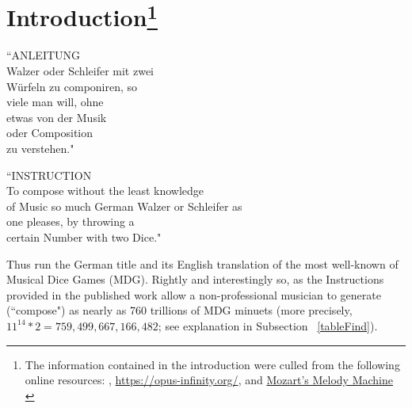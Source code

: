 \documentclass[letterpaper,x11names,svgnames,10pt]{article}
\begin{document}
\section[Introduction]{Introduction\footnote{The information contained in the introduction were culled from the following online resources:
	\citet{wiki_mw2017},
	\url{https://opus-infinity.org/}, and 
	\href{https://www.sciencenews.org/article/mozarts-melody-machine-0}{Mozart's Melody Machine} \citep*{peterson2001}
	}
}
	\begin{center}
	\begin{minipage}{0.4\textwidth}
	\begin{flushleft}
		\begin{center}
			``ANLEITUNG\\
			Walzer oder Schleifer mit zwei\\
			W\"{u}rfeln zu componiren, so\\
			viele man will, ohne\\
			etwas von der Musik\\
			oder Composition\\
			zu verstehen."\\
		\end{center}
	\end{flushleft}
	\end{minipage}
	\begin{minipage}{0.4\textwidth}
	\begin{flushright}
		\begin{center}
		``INSTRUCTION\\
		To compose without the least knowledge\\
		of Music so much German Walzer or Schleifer as\\
		one pleases, by throwing a\\
		certain Number with two Dice."
	\end{center}
	\end{flushright}
	\end{minipage}
	\end{center}

Thus run the German title and its English translation of the most well-known of Musical Dice Games (MDG).  Rightly and interestingly so, as the Instructions provided in the published work allow a non-professional musician to generate (``compose") as nearly as 760 trillions of MDG minuets (more precisely, $11^{14}*2 = 759,499,667,166,482$; see explanation in Subsection ~\ref{tableFind}).\\  
\end{document}
